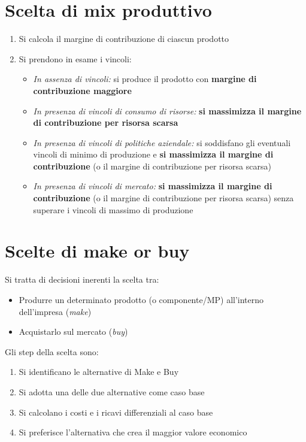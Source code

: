 \section{Scelta di mix produttivo}
\begin{enumerate}
	\item Si calcola il margine di contribuzione di ciascun prodotto
	\item Si prendono in esame i vincoli:
	\begin{itemize}
		\item \emph{In assenza di vincoli:} si produce il prodotto con \textbf{margine di contribuzione
		maggiore}
		\item \emph{In presenza di vincoli di consumo di risorse:} \textbf{si massimizza il margine di
		contribuzione per risorsa scarsa}
		\item \emph{In presenza di vincoli di politiche aziendale:} si soddisfano gli eventuali
		vincoli di minimo di produzione e \textbf{si massimizza il margine di
		contribuzione} (o il margine di contribuzione per risorsa scarsa)
		\item \emph{In presenza di vincoli di mercato:} \textbf{si massimizza il margine di
		contribuzione} (o il margine di contribuzione per risorsa scarsa) senza
		superare i vincoli di massimo di produzione
	\end{itemize}

\end{enumerate}

\section{Scelte di make or buy}
Si tratta di decisioni inerenti la scelta tra:
\begin{itemize}
	\item Produrre un determinato prodotto (o componente/MP) all’interno
	dell’impresa (\emph{make})
	\item Acquistarlo sul mercato (\emph{buy})
\end{itemize}

Gli step della scelta sono:
\begin{enumerate}
	\item Si identificano le alternative di Make e Buy
	\item Si adotta una delle due alternative come caso base
	\item Si calcolano i costi e i ricavi differenziali al caso base
	\item Si preferisce l’alternativa che crea il maggior valore economico
\end{enumerate}


